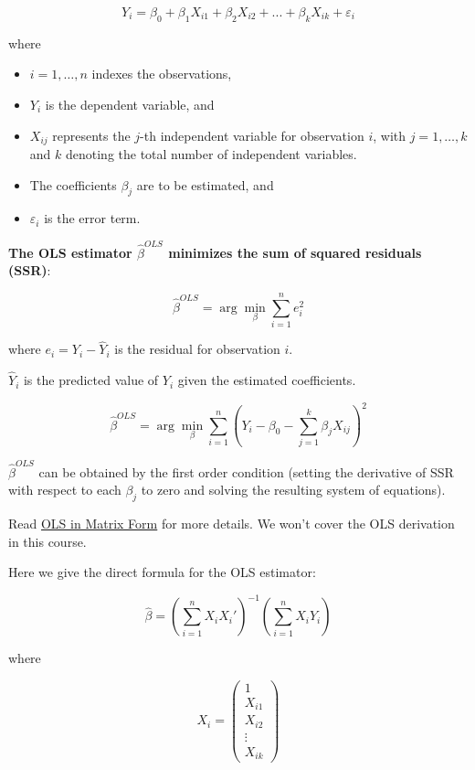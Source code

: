 \documentclass[
  12pt,
  letterpaper,
]{scrbook}
\providecommand{\tightlist}{%
  \setlength{\itemsep}{0pt}\setlength{\parskip}{0pt}}
\renewcommand{\tightlist}{\setlength{\itemsep}{0.5\baselineskip}\setlength{\parskip}{0.2\baselineskip}}
\theoremstyle{definition}
\theoremstyle{plain}
\theoremstyle{remark}
\begin{document}
\[
Y_i = \beta_0 + \beta_1 X_{i1} + \beta_2 X_{i2} + ... + \beta_k X_{ik} + \varepsilon_i
\]

where

\begin{itemize}
\tightlist
\item
  \(i=1,\ldots, n\) indexes the observations,
\item
  \(Y_i\) is the dependent variable, and
\item
  \(X_{ij}\) represents the \(j\)-th independent variable for
  observation \(i\), with \(j = 1, \ldots, k\) and \(k\) denoting the
  total number of independent variables.
\item
  The coefficients \(\beta_j\) are to be estimated, and
\item
  \(\varepsilon_i\) is the error term.
\end{itemize}

\textbf{The OLS estimator \(\hat{\beta}^{OLS}\) minimizes the sum of
squared residuals (SSR)}:

\[
\hat{\beta}^{OLS} = \arg\min_{\beta} \sum_{i=1}^{n} e_i^2 
\]

where \(e_i = Y_i - \hat{Y}_i\) is the residual for observation \(i\).

\(\hat{Y}_i\) is the predicted value of \(Y_i\) given the estimated
coefficients.

\[
\hat{\beta}^{OLS} = \arg\min_{\beta} \sum_{i=1}^{n} (Y_i - \beta_0 - \sum_{j=1}^{k} \beta_j X_{ij})^2
\]

\(\hat{\beta}^{OLS}\) can be obtained by the first order condition
(setting the derivative of SSR with respect to each \(\beta_j\) to zero
and solving the resulting system of equations).

Read
\href{https://github.com/my1396/FIN5005-Fall2024/blob/a4ec0c87c6bcbd463b4da1ad78878b1fe329cda4/images/matrix_OLS_NYU_notes.pdf}{OLS
in Matrix Form} for more details. We won't cover the OLS derivation in
this course.

Here we give the direct formula for the OLS estimator:

\[
\hat\beta = \left(\sum_{i=1}^n X_iX_i'\right)^{-1} \left(\sum_{i=1}^n X_iY_i\right)
\]

where

\[
X_i = \begin{pmatrix}1 \\ X_{i1} \\ X_{i2} \\ \vdots \\ X_{ik}\end{pmatrix}
\]
\end{document}
